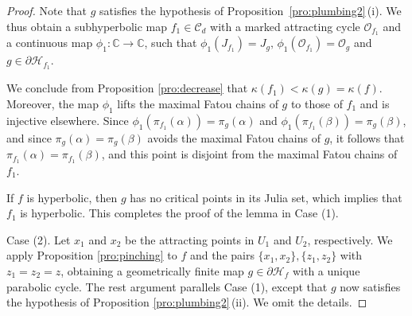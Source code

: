 \documentclass[a4paper,reqno,times, 11pt]{amsart}
\theoremstyle{remark}
\theoremstyle{plain}
\numberwithin{equation}{section}
\def\OOO{{\cal O}}
\def\HHHH{\mathscr H}
\def\CCCC{\mathscr C}
\def\cal{\mathcal}
\begin{document}
\begin{proof}
	
	
	Note that $g$ satisfies the hypothesis of Proposition~\ref{pro:plumbing2}\,(i).
	We thus obtain a subhyperbolic map $f_1 \in\CCCC_d$ with a marked attracting cycle $\mathcal{O}_{f_1}$ and a continuous map $\phi_1: \mathbb{C} \to \mathbb{C}$, such that  $\phi_1(J_{f_1})=J_g,\,\phi_1(\OOO_{f_1})=\OOO_g$ and $g\in\partial\HHHH_{f_1}$.
	
	
	We conclude from Proposition \ref{pro:decrease} that $\kappa(f_1)<\kappa(g)=\kappa(f)$. Moreover, the map $\phi_1$ lifts the maximal Fatou chains of $g$ to those of $f_1$ and is injective elsewhere. Since $\phi_1(\pi_{f_1}(\alpha))=\pi_g(\alpha)$ and $\phi_1(\pi_{f_1}(\beta))=\pi_g(\beta)$, and since $\pi_g(\alpha)=\pi_g(\beta)$ avoids the maximal Fatou chains of $g$, it follows that $\pi_{f_1}(\alpha)=\pi_{f_1}(\beta)$, and this point is disjoint from the maximal Fatou chains of $f_1$.
	
	If $f$ is hyperbolic, then $g$ has no critical points in its Julia set, which implies that $f_1$ is hyperbolic. This completes the proof of the lemma in Case (1).
	\vspace{2pt}
	
	Case (2). Let $x_1$ and $x_2$ be the attracting points in $U_1$ and $U_2$, respectively. We apply Proposition \ref{pro:pinching} to $f$ and the pairs $\{x_1,x_2\}, \{z_1,z_2\}$ with $z_1=z_2=z$, obtaining a geometrically finite map $g\in\partial\HHHH_f$ with a unique parabolic cycle. The rest argument parallels Case (1), except that $g$ now satisfies the hypothesis of Proposition \ref{pro:plumbing2}\,(ii). We omit the details.
	\vspace{2pt}
	

\end{proof}
\end{document}

